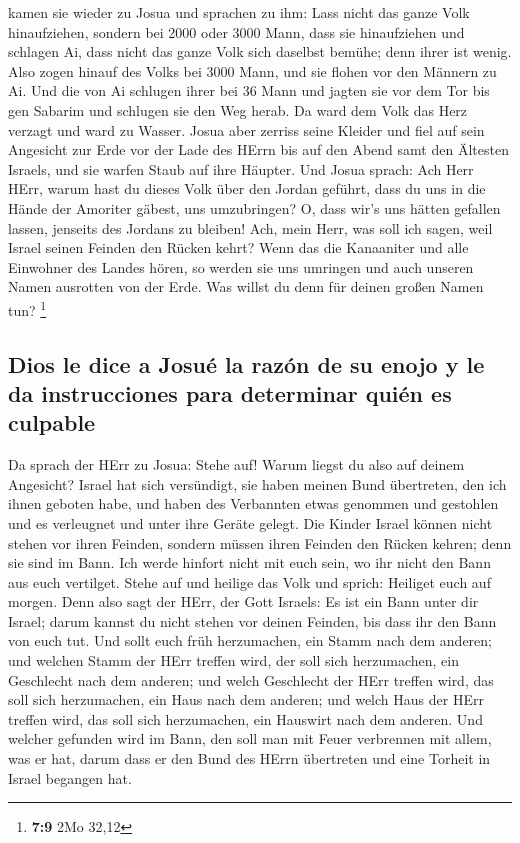  kamen sie wieder zu Josua und sprachen zu ihm: Lass nicht
das ganze Volk hinaufziehen, sondern bei 2000 oder 3000 Mann, dass sie
hinaufziehen und schlagen Ai, dass nicht das ganze Volk sich daselbst
bemühe; denn ihrer ist wenig.  Also zogen hinauf des Volks
bei 3000 Mann, und sie flohen vor den Männern zu Ai.  Und
die von Ai schlugen ihrer bei 36 Mann und jagten sie vor dem Tor bis gen
Sabarim und schlugen sie den Weg herab. Da ward dem Volk das Herz
verzagt und ward zu Wasser.  Josua aber zerriss seine
Kleider und fiel auf sein Angesicht zur Erde vor der Lade des HErrn bis
auf den Abend samt den Ältesten Israels, und sie warfen Staub auf ihre
Häupter.  Und Josua sprach: Ach Herr HErr, warum hast du
dieses Volk über den Jordan geführt, dass du uns in die Hände der
Amoriter gäbest, uns umzubringen? O, dass wir's uns hätten gefallen
lassen, jenseits des Jordans zu bleiben!  Ach, mein Herr,
was soll ich sagen, weil Israel seinen Feinden den Rücken kehrt?
 Wenn das die Kanaaniter und alle Einwohner des Landes
hören, so werden sie uns umringen und auch unseren Namen ausrotten von
der Erde. Was willst du denn für deinen großen Namen tun? \footnote{\textbf{7:9}
  2Mo 32,12}

\hypertarget{dios-le-dice-a-josuuxe9-la-razuxf3n-de-su-enojo-y-le-da-instrucciones-para-determinar-quiuxe9n-es-culpable}{%
\subsection{Dios le dice a Josué la razón de su enojo y le da
instrucciones para determinar quién es
culpable}\label{dios-le-dice-a-josuuxe9-la-razuxf3n-de-su-enojo-y-le-da-instrucciones-para-determinar-quiuxe9n-es-culpable}}

 Da sprach der HErr zu Josua: Stehe auf! Warum liegst du
also auf deinem Angesicht?  Israel hat sich versündigt,
sie haben meinen Bund übertreten, den ich ihnen geboten habe, und haben
des Verbannten etwas genommen und gestohlen und es verleugnet und unter
ihre Geräte gelegt.  Die Kinder Israel können nicht
stehen vor ihren Feinden, sondern müssen ihren Feinden den Rücken
kehren; denn sie sind im Bann. Ich werde hinfort nicht mit euch sein, wo
ihr nicht den Bann aus euch vertilget.  Stehe auf und
heilige das Volk und sprich: Heiliget euch auf morgen. Denn also sagt
der HErr, der Gott Israels: Es ist ein Bann unter dir Israel; darum
kannst du nicht stehen vor deinen Feinden, bis dass ihr den Bann von
euch tut.  Und sollt euch früh herzumachen, ein Stamm
nach dem anderen; und welchen Stamm der HErr treffen wird, der soll sich
herzumachen, ein Geschlecht nach dem anderen; und welch Geschlecht der
HErr treffen wird, das soll sich herzumachen, ein Haus nach dem anderen;
und welch Haus der HErr treffen wird, das soll sich herzumachen, ein
Hauswirt nach dem anderen.  Und welcher gefunden wird im
Bann, den soll man mit Feuer verbrennen mit allem, was er hat, darum
dass er den Bund des HErrn übertreten und eine Torheit in Israel
begangen hat.

